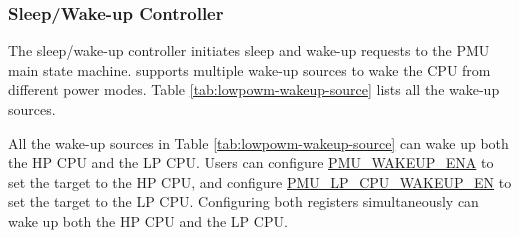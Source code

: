 \documentclass[main\_\_EN.tex]{subfiles}
\begin{document}
\subsubsection{Sleep/Wake-up Controller}

The sleep/wake-up controller initiates sleep and wake-up requests to the PMU main state machine. \chipname{} supports multiple wake-up sources to wake the CPU from different power modes. Table \ref{tab:lowpowm-wakeup-source} lists all the wake-up sources.

All the wake-up sources in Table \ref{tab:lowpowm-wakeup-source} can wake up both the HP CPU and the LP CPU. Users can configure \hyperref[fielddesc:PMUWAKEUPENA]{PMU\_WAKEUP\_ENA} to set the target to the HP CPU, and configure \hyperref[fielddesc:PMULPCPUWAKEUPEN]{PMU\_LP\_CPU\_WAKEUP\_EN} to set the target to the LP CPU. Configuring both registers simultaneously can wake up both the HP CPU and the LP CPU.
\end{document}
